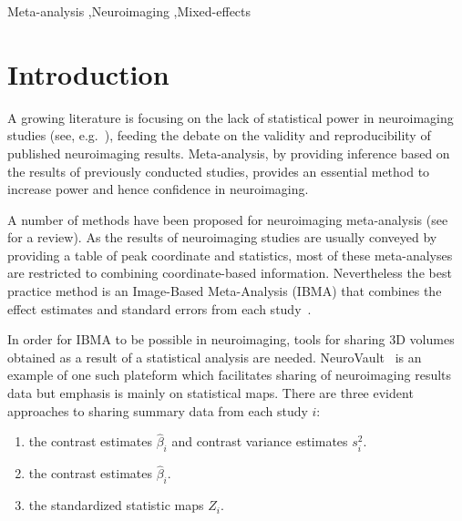 \documentclass[preprint]{elsarticle}
\newcommand{\effectvector}{\hat\beta}
\newcommand{\effect}[1][i]{\effectvector_{#1}}
\newcommand{\vareffect}[1][i]{s^2_{#1}}
\newcommand{\zeffect}[1][\studyidx]{Z_{#1}}
\newcommand{\studyidx}{i}
\begin{document}
\begin{frontmatter}
\begin{abstract}
\end{abstract}

\begin{keyword}
Meta-analysis \sep Neuroimaging \sep Mixed-effects 


\end{keyword}

\end{frontmatter}


\section{Introduction}

A growing literature is focusing on the lack of statistical power in neuroimaging studies (see, e.g.~\cite{Button2013}), feeding the debate on the validity and reproducibility of published neuroimaging results. Meta-analysis, by providing inference based on the results of previously conducted studies, provides an essential method to increase power and hence confidence in neuroimaging.

A number of methods have been proposed for neuroimaging meta-analysis (see~\cite{Radua2012} for a review). As the results of neuroimaging studies are usually conveyed by providing a table of peak coordinate and statistics, most of these meta-analyses are restricted to combining coordinate-based information. Nevertheless the best practice method is an Image-Based Meta-Analysis (IBMA) that combines the effect estimates and standard errors from each study~\cite{Salimi-khorshidi2009}. 

In order for IBMA to be possible in neuroimaging, tools for sharing 3D volumes obtained as a result of a statistical analysis are needed. NeuroVault~\cite{Gorgolewski2015} is an example of one such plateform which facilitates sharing of neuroimaging results data but emphasis is mainly on statistical maps. There are three evident approaches to sharing summary data from each study $i$:
\begin{enumerate}
	\item the contrast estimates $\effect$ and contrast variance estimates $\vareffect$.
	\item the contrast estimates $\effect$.	
	\item the standardized statistic maps $\zeffect$.		
\end{enumerate}
\end{document}
